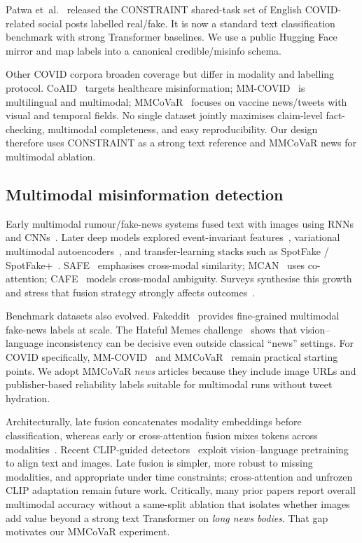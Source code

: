 \documentclass[12pt, a4paper]{report}
\begin{document}
Patwa et~al.~\cite{patwa2021fighting} released the CONSTRAINT shared-task set of English COVID-related social posts labelled real/fake.
It is now a standard text classification benchmark with strong Transformer baselines.
We use a public Hugging Face mirror and map labels into a canonical credible/misinfo schema.

Other COVID corpora broaden coverage but differ in modality and labelling protocol.
CoAID~\cite{cui2020coaid} targets healthcare misinformation; MM-COVID~\cite{li2020mmcovid} is multilingual and multimodal; MMCoVaR~\cite{chen2021mmcovar} focuses on vaccine news/tweets with visual and temporal fields.
No single dataset jointly maximises claim-level fact-checking, multimodal completeness, and easy reproducibility.
Our design therefore uses CONSTRAINT as a strong text reference and MMCoVaR news for multimodal ablation.

\subsection{Multimodal misinformation detection}

Early multimodal rumour/fake-news systems fused text with images using RNNs and CNNs~\cite{jin2017multimodal}.
Later deep models explored event-invariant features~\cite{wang2018eann}, variational multimodal autoencoders~\cite{khattar2019mvae}, and transfer-learning stacks such as SpotFake / SpotFake+~\cite{singhal2019spotfake,singhal2020spotfakeplus}.
SAFE~\cite{zhou2020safe} emphasises cross-modal similarity; MCAN~\cite{wu2021mcan} uses co-attention; CAFE~\cite{chen2022cafe} models cross-modal ambiguity.
Surveys synthesise this growth and stress that fusion strategy strongly affects outcomes~\cite{alam2022survey,tufchi2023survey}.

Benchmark datasets also evolved.
Fakeddit~\cite{nakamura2020fakeddit} provides fine-grained multimodal fake-news labels at scale.
The Hateful Memes challenge~\cite{kiela2020hateful} shows that vision--language inconsistency can be decisive even outside classical ``news'' settings.
For COVID specifically, MM-COVID~\cite{li2020mmcovid} and MMCoVaR~\cite{chen2021mmcovar} remain practical starting points.
We adopt MMCoVaR \emph{news} articles because they include image URLs and publisher-based reliability labels suitable for multimodal runs without tweet hydration.

Architecturally, late fusion concatenates modality embeddings before classification, whereas early or cross-attention fusion mixes tokens across modalities~\cite{kiela2019mmbt,wu2021mcan,chen2022cafe}.
Recent CLIP-guided detectors~\cite{zhou2023fndclip} exploit vision--language pretraining to align text and images.
Late fusion is simpler, more robust to missing modalities, and appropriate under time constraints; cross-attention and unfrozen CLIP adaptation remain future work.
Critically, many prior papers report overall multimodal accuracy without a same-split ablation that isolates whether images add value beyond a strong text Transformer on \emph{long news bodies}.
That gap motivates our MMCoVaR experiment.
\end{document}
